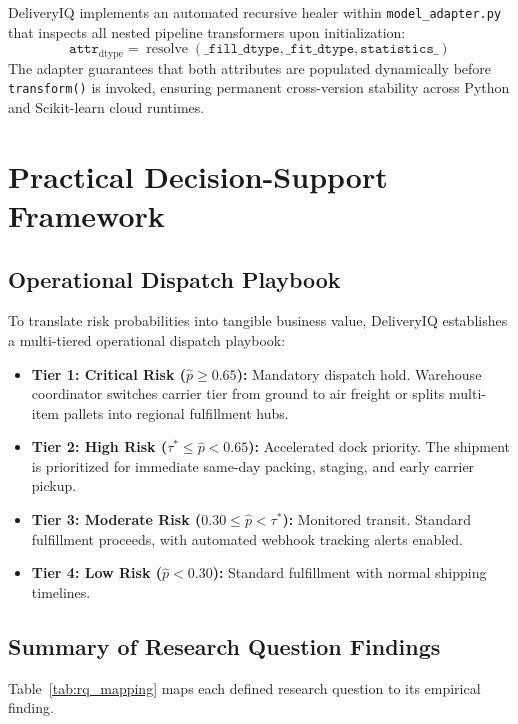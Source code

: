 \documentclass[journal,10pt,twocolumn]{IEEEtran}
\begin{document}
DeliveryIQ implements an automated recursive healer within \texttt{model\_adapter.py} that inspects all nested pipeline transformers upon initialization:
\begin{equation}
\texttt{attr}_{\text{dtype}} = \operatorname{resolve}(\texttt{\_fill\_dtype}, \texttt{\_fit\_dtype}, \texttt{statistics\_})
\end{equation}
The adapter guarantees that both attributes are populated dynamically before \texttt{transform()} is invoked, ensuring permanent cross-version stability across Python and Scikit-learn cloud runtimes.

\section{Practical Decision-Support Framework}
\label{sec:decision_framework}

\subsection{Operational Dispatch Playbook}
To translate risk probabilities into tangible business value, DeliveryIQ establishes a multi-tiered operational dispatch playbook:
\begin{itemize}
    \item \textbf{Tier 1: Critical Risk ($\hat{p} \ge 0.65$):} Mandatory dispatch hold. Warehouse coordinator switches carrier tier from ground to air freight or splits multi-item pallets into regional fulfillment hubs.
    \item \textbf{Tier 2: High Risk ($\tau^* \le \hat{p} < 0.65$):} Accelerated dock priority. The shipment is prioritized for immediate same-day packing, staging, and early carrier pickup.
    \item \textbf{Tier 3: Moderate Risk ($0.30 \le \hat{p} < \tau^*$):} Monitored transit. Standard fulfillment proceeds, with automated webhook tracking alerts enabled.
    \item \textbf{Tier 4: Low Risk ($\hat{p} < 0.30$):} Standard fulfillment with normal shipping timelines.
\end{itemize}

\subsection{Summary of Research Question Findings}
Table~\ref{tab:rq_mapping} maps each defined research question to its empirical finding.
\end{document}
